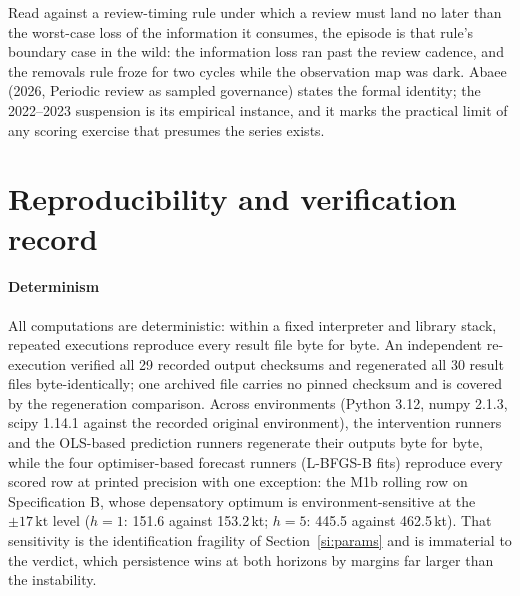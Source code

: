 \documentclass[preprint,11pt,authoryear]{elsarticle}
\theoremstyle{remark}
\newcommand{\kt}{\,\mathrm{kt}}
\begin{document}
Read against a review-timing rule under which a review must land no later than the worst-case loss of the information it consumes, the episode is that rule's boundary case in the wild: the information loss ran past the review cadence, and the removals rule froze for two cycles while the observation map was dark. Abaee (2026, Periodic review as sampled governance) states the formal identity; the 2022--2023 suspension is its empirical instance, and it marks the practical limit of any scoring exercise that presumes the series exists.

\FloatBarrier
\section{Reproducibility and verification record}\label{si:repro}

\paragraph{Determinism} All computations are deterministic: within a fixed interpreter and library stack, repeated executions reproduce every result file byte for byte. An independent re-execution verified all 29 recorded output checksums and regenerated all 30 result files byte-identically; one archived file carries no pinned checksum and is covered by the regeneration comparison. Across environments (Python 3.12, numpy 2.1.3, scipy 1.14.1 against the recorded original environment), the intervention runners and the OLS-based prediction runners regenerate their outputs byte for byte, while the four optimiser-based forecast runners (L-BFGS-B fits) reproduce every scored row at printed precision with one exception: the M1b rolling row on Specification B, whose depensatory optimum is environment-sensitive at the $\pm17\kt$ level ($h=1$: 151.6 against 153.2\,kt; $h=5$: 445.5 against 462.5\,kt). That sensitivity is the identification fragility of Section~\ref{si:params} and is immaterial to the verdict, which persistence wins at both horizons by margins far larger than the instability.
\end{document}
